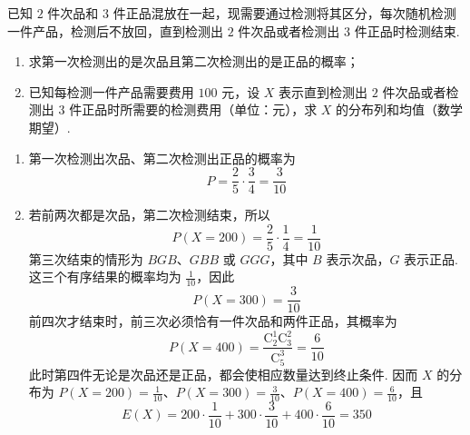 \begin{problem}
已知 \(2\) 件次品和 \(3\) 件正品混放在一起，现需要通过检测将其区分，每次随机检测一件产品，检测后不放回，直到检测出 \(2\) 件次品或者检测出 \(3\) 件正品时检测结束.

\begin{enumerate}
\item 求第一次检测出的是次品且第二次检测出的是正品的概率；
\item 已知每检测一件产品需要费用 \(100\) 元，设 \(X\) 表示直到检测出 \(2\) 件次品或者检测出 \(3\) 件正品时所需要的检测费用（单位：元），求 \(X\) 的分布列和均值（数学期望）.
\end{enumerate}
\begin{solution}
\begin{enumerate}
\item 第一次检测出次品、第二次检测出正品的概率为
\[
P=\frac25\cdot\frac34=\frac3{10}
\]

\item 若前两次都是次品，第二次检测结束，所以
\[
P(X=200)=\frac25\cdot\frac14=\frac1{10}
\]
第三次结束的情形为 \(BGB\)、\(GBB\) 或 \(GGG\)，其中 \(B\) 表示次品，\(G\) 表示正品. 这三个有序结果的概率均为 \(\frac1{10}\)，因此
\[
P(X=300)=\frac3{10}
\]
前四次才结束时，前三次必须恰有一件次品和两件正品，其概率为
\[
P(X=400)=\frac{\mathrm C_2^1\mathrm C_3^2}{\mathrm C_5^3}=\frac6{10}
\]
此时第四件无论是次品还是正品，都会使相应数量达到终止条件. 因而 \(X\) 的分布为
\(P(X=200)=\frac1{10}\)、\(P(X=300)=\frac3{10}\)、\(P(X=400)=\frac6{10}\)，且
\[
E(X)=200\cdot\frac1{10}+300\cdot\frac3{10}+400\cdot\frac6{10}=350
\]
\end{enumerate}
\end{solution}
\end{problem}

